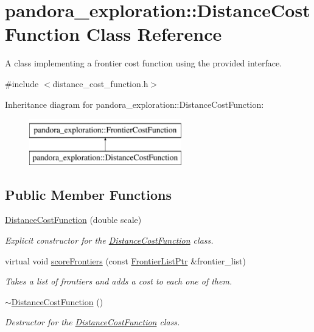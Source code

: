 \hypertarget{classpandora__exploration_1_1_distance_cost_function}{\section{pandora\-\_\-exploration\-:\-:\-Distance\-Cost\-Function \-Class \-Reference}
\label{classpandora__exploration_1_1_distance_cost_function}
}


\-A class implementing a frontier cost function using the provided interface.  




{\ttfamily \#include $<$distance\-\_\-cost\-\_\-function.\-h$>$}

\-Inheritance diagram for pandora\-\_\-exploration\-:\-:\-Distance\-Cost\-Function\-:\begin{figure}[H]
\begin{center}
\leavevmode
\includegraphics[height=2.000000cm]{classpandora__exploration_1_1_distance_cost_function}
\end{center}
\end{figure}
\subsection*{\-Public \-Member \-Functions}
\begin{DoxyCompactItemize}
\item 
\hyperlink{classpandora__exploration_1_1_distance_cost_function_a1b5c513565474e7ca1e544a5bf92cf0d}{\-Distance\-Cost\-Function} (double scale)
\begin{DoxyCompactList}\small\item\em \-Explicit constructor for the \hyperlink{classpandora__exploration_1_1_distance_cost_function}{\-Distance\-Cost\-Function} class. \end{DoxyCompactList}\item 
virtual void \hyperlink{classpandora__exploration_1_1_distance_cost_function_ae8202eb69bfe1888983f4f57b7b6e95f}{score\-Frontiers} (const \hyperlink{namespacepandora__exploration_a6f3b1959fca391e2ef3ac46b6e96be7a}{\-Frontier\-List\-Ptr} \&frontier\-\_\-list)
\begin{DoxyCompactList}\small\item\em \-Takes a list of frontiers and adds a cost to each one of them. \end{DoxyCompactList}\item 
\hyperlink{classpandora__exploration_1_1_distance_cost_function_ab51dbb14ab0215ed8eb358c9b34683e9}{$\sim$\-Distance\-Cost\-Function} ()
\begin{DoxyCompactList}\small\item\em \-Destructor for the \hyperlink{classpandora__exploration_1_1_distance_cost_function}{\-Distance\-Cost\-Function} class. \end{DoxyCompactList}\end{DoxyCompactItemize}


